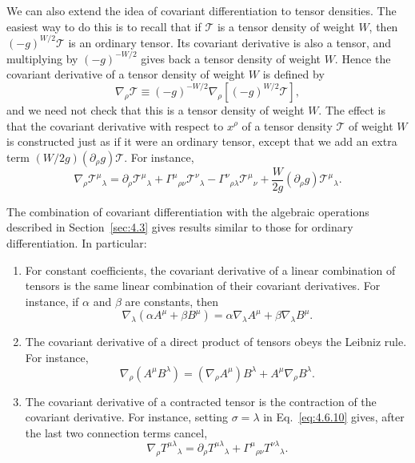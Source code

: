 We can also extend the idea of covariant differentiation to tensor densities.
The easiest way to do this is to recall that if
\(\mathcal T\) is a tensor density of weight \(W\), then
\((-g)^{W/2}\mathcal T\) is an ordinary tensor. Its covariant derivative is
also a tensor, and multiplying by \((-g)^{-W/2}\) gives back a tensor density
of weight \(W\). Hence the covariant derivative of a tensor density of weight
\(W\) is defined by
\begin{equation}
  \nabla_\rho\mathcal T
  \equiv
  (-g)^{-W/2}
  \nabla_\rho\!\left[(-g)^{W/2}\mathcal T\right],
  \tag{4.6.11}\label{eq:4.6.11}
\end{equation}
and we need not check that this is a tensor density of weight \(W\). The
effect is that the covariant derivative with respect to \(x^\rho\) of a
tensor density \(\mathcal T\) of weight \(W\) is constructed just as if it
were an ordinary tensor, except that we add an extra term
\((W/2g)(\partial_\rho g)\mathcal T\). For instance,
\begin{equation}
  \nabla_\rho\mathcal T^\mu{}_\lambda
  =
  \partial_\rho\mathcal T^\mu{}_\lambda
  +\Gamma^\mu{}_{\rho\nu}\mathcal T^\nu{}_\lambda
  -\Gamma^\nu{}_{\rho\lambda}\mathcal T^\mu{}_\nu
  +\frac{W}{2g}(\partial_\rho g)\mathcal T^\mu{}_\lambda.
  \tag{4.6.12}\label{eq:4.6.12}
\end{equation}

The combination of covariant differentiation with the algebraic operations
described in Section~\ref{sec:4.3} gives results similar to those for ordinary
differentiation. In particular:

\begin{enumerate}
  \item[(A)] For constant coefficients, the covariant derivative of a linear
  combination of tensors is the same linear combination of their covariant
  derivatives. For instance, if \(\alpha\) and \(\beta\) are constants, then
  \begin{equation}
    \nabla_\lambda(\alpha A^\mu+\beta B^\mu)
    =
    \alpha\nabla_\lambda A^\mu+\beta\nabla_\lambda B^\mu.
    \tag{4.6.13}\label{eq:4.6.13}
  \end{equation}

  \item[(B)] The covariant derivative of a direct product of tensors obeys
  the Leibniz rule. For instance,
  \begin{equation}
    \nabla_\rho(A^\mu B^\lambda)
    =
    (\nabla_\rho A^\mu)B^\lambda
    +A^\mu\nabla_\rho B^\lambda.
    \tag{4.6.14}\label{eq:4.6.14}
  \end{equation}

  \item[(C)] The covariant derivative of a contracted tensor is the
  contraction of the covariant derivative. For instance, setting
  \(\sigma=\lambda\) in Eq.~\eqref{eq:4.6.10} gives, after the last two
  connection terms cancel,
  \begin{equation}
    \nabla_\rho T^{\mu\lambda}{}_\lambda
    =
    \partial_\rho T^{\mu\lambda}{}_\lambda
    +\Gamma^\mu{}_{\rho\nu}T^{\nu\lambda}{}_\lambda.
    \tag{4.6.15}\label{eq:4.6.15}
  \end{equation}
\end{enumerate}

